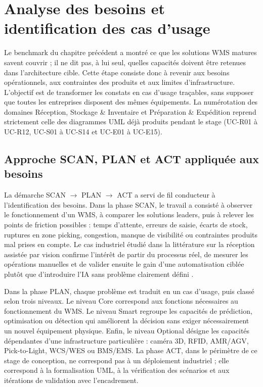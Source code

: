 \chapter{Analyse des besoins et identification des cas d’usage}

\label{chap:3}

Le benchmark du chapitre précédent a montré ce que les solutions WMS matures savent couvrir ; il ne dit pas, à lui seul, quelles capacités doivent être retenues dans l’architecture cible. Cette étape consiste donc à revenir aux besoins opérationnels, aux contraintes des produits et aux limites d’infrastructure. L’objectif est de transformer les constats en cas d’usage traçables, sans supposer que toutes les entreprises disposent des mêmes équipements. La numérotation des domaines Réception, Stockage \& Inventaire et Préparation \& Expédition reprend strictement celle des diagrammes UML déjà produits pendant le stage (UC-R01 à UC-R12, UC-S01 à UC-S14 et UC-E01 à UC-E15).



\section{Approche SCAN, PLAN et ACT appliquée aux besoins}

\label{sec:3.1}

La démarche SCAN \(\rightarrow\) PLAN \(\rightarrow\) ACT a servi de fil conducteur à l’identification des besoins. Dans la phase SCAN, le travail a consisté à observer le fonctionnement d’un WMS, à comparer les solutions leaders, puis à relever les points de friction possibles : temps d’attente, erreurs de saisie, écarts de stock, ruptures en zone picking, congestion, manque de visibilité ou contraintes produits mal prises en compte. Le cas industriel étudié dans la littérature sur la réception assistée par vision confirme l’intérêt de partir du processus réel, de mesurer les opérations manuelles et de valider ensuite le gain d’une automatisation ciblée plutôt que d’introduire l’IA sans problème clairement défini \cite{ref11}.


Dans la phase PLAN, chaque problème est traduit en un cas d’usage, puis classé selon trois niveaux. Le niveau Core correspond aux fonctions nécessaires au fonctionnement du WMS. Le niveau Smart regroupe les capacités de prédiction, optimisation ou détection qui améliorent la décision sans exiger nécessairement un nouvel équipement physique. Enfin, le niveau Optional désigne les capacités dépendantes d’une infrastructure particulière : caméra 3D, RFID, AMR/AGV, Pick-to-Light, WCS/WES ou BMS/EMS. La phase ACT, dans le périmètre de ce stage de conception, ne correspond pas à un déploiement industriel ; elle correspond à la formalisation UML, à la vérification des scénarios et aux itérations de validation avec l’encadrement.


